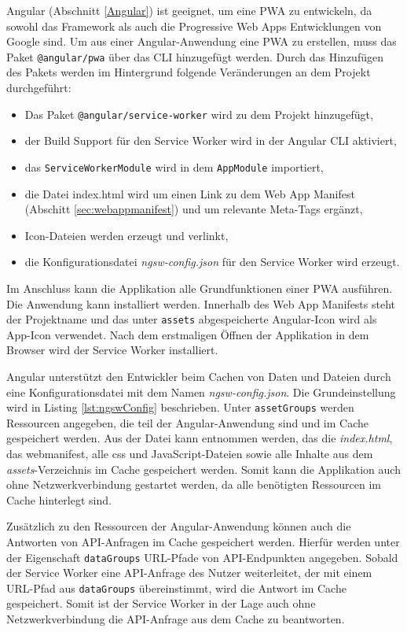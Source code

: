 Angular (Abschnitt \ref{Angular}) ist geeignet, um eine PWA zu entwickeln, da sowohl das Framework als auch die Progressive Web Apps Entwicklungen von Google sind. 
Um aus einer Angular-Anwendung eine PWA zu erstellen, muss das Paket \texttt{@angular/pwa} über das \ac{CLI} hinzugefügt werden.
Durch das Hinzufügen des Pakets werden im Hintergrund folgende Veränderungen an dem Projekt durchgeführt: 
\begin{itemize}
    \item Das Paket \texttt{@angular/service-worker} wird zu dem Projekt hinzugefügt,
    \item der Build Support für den Service Worker wird in der Angular CLI aktiviert,
    \item das \texttt{ServiceWorkerModule} wird in dem \texttt{AppModule} importiert,
    \item die Datei index.html wird um einen Link zu dem Web App Manifest (Abschitt \ref{sec:webappmanifest}) und um relevante Meta-Tags ergänzt,
    \item Icon-Dateien werden erzeugt und verlinkt,
    \item die Konfigurationsdatei \textit{ngsw-config.json} für den Service Worker wird erzeugt. 
\end{itemize}

Im Anschluss kann die Applikation alle Grundfunktionen einer PWA ausführen. Die Anwendung kann installiert werden. Innerhalb des Web App Manifests steht der Projektname und das unter \texttt{assets} abgespeicherte Angular-Icon wird als App-Icon verwendet. Nach dem erstmaligen Öffnen der Applikation in dem Browser wird der Service Worker installiert. 

Angular unterstützt den Entwickler beim Cachen von Daten und Dateien durch eine Konfigurationsdatei mit dem Namen \textit{ngsw-config.json}. Die Grundeinstellung wird in Listing \ref{lst:ngswConfig} beschrieben. Unter \texttt{assetGroups} werden Ressourcen angegeben, die teil der Angular-Anwendung sind und im Cache gespeichert werden. Aus der Datei kann entnommen werden, das die \textit{index.html}, das webmanifest, alle css und JavaScript-Dateien sowie alle Inhalte aus dem \textit{assets}-Verzeichnis im Cache gespeichert werden. 
Somit kann die Applikation auch ohne Netzwerkverbindung gestartet werden, da alle benötigten Ressourcen im Cache hinterlegt sind. 

Zusätzlich zu den Ressourcen der Angular-Anwendung können auch 
die Antworten von API-Anfragen im Cache gespeichert werden.
Hierfür werden unter der Eigenschaft \texttt{dataGroups} URL-Pfade von API-Endpunkten angegeben. Sobald der Service Worker eine API-Anfrage des Nutzer weiterleitet, der mit einem URL-Pfad aus \texttt{dataGroups} übereinstimmt, wird die Antwort im Cache gespeichert. 
Somit ist der Service Worker in der Lage auch ohne Netzwerkverbindung die API-Anfrage aus dem Cache zu beantworten. 

